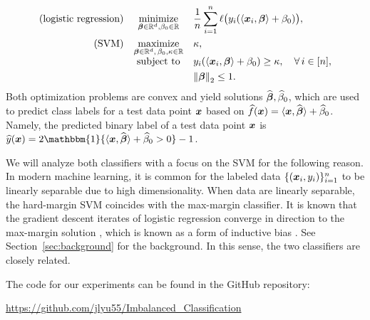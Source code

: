 \begin{subequations}
\begin{align}
\begin{array}{lcl}
    \text{(logistic regression)} 
    & 
    \mathmakebox[\widthof{$ \displaystyle\maximize \limits_{\bbeta \in \R^d, \, \beta_0, \kappa \in \R} $}][c]{
    \minimize \limits_{\vbeta \in \R^d, \beta_0 \in \R}
    } 
    & 
    \mathmakebox[\widthof{$ \displaystyle y_i ( \< \xx_i, \bbeta \> + \beta_0 ) \ge \kappa,
	\quad \forall\, i \in [n], $}][l]{
    \displaystyle \frac{1}{n} \sum_{i=1}^n \ell \bigl( y_i(\langle \vx_i, \vbeta \rangle + \beta_0) \bigr),
    }
\end{array}
\label{eq:logistic}
\\
\begin{array}{lcl}
    \text{(SVM)}  & 
    \maximize \limits_{\bbeta \in \R^d, \, \beta_0, \kappa \in \R} & \kappa,  \\
    & \text{subject to}\vphantom{\displaystyle\max_\kappa} & y_i ( \< \xx_i, \bbeta \> + \beta_0 ) \ge \kappa,
	\quad \forall\, i \in [n],    
    \\
    & & \norm{\bbeta}_2  \le  1.
\end{array}
\label{eq:SVM-0}
\end{align}
\end{subequations}
Both optimization problems are convex and yield solutions $\widehat {{\boldsymbol{\beta}}}, \widehat \beta_0$, which are used to predict class labels for a test data point ${\boldsymbol{x}}$ based on $\widehat f({\boldsymbol{x}}) = \langle {\boldsymbol{x}}, \widehat {{\boldsymbol{\beta}}} \rangle + \widehat \beta_0$. Namely, the predicted binary label of a test data point ${\boldsymbol{x}}$ is $\hat{y} (\xx) = 2\mathbbm{1}\{\langle \vx, \hat{\vbeta} \rangle + \hat{\beta}_0 > 0\} - 1$.


We will analyze both classifiers with a focus on the SVM for the following reason. In modern machine learning, it is common for the labeled data $\{({\boldsymbol{x}}_i, y_i)\}_{i = 1}^n$ to be linearly separable due to high dimensionality.
When data are linearly separable, the hard-margin SVM coincides with the max-margin classifier. It is known that the gradient descent iterates of logistic regression converge in direction to the max-margin solution \cite{Soudry_implicit_bias, ji2019riskparameterconvergencelogistic}, which is known as a form of inductive bias \cite{neyshabur2015searchrealinductivebias}. See Section~\ref{sec:background} for the background. In this sense, the two classifiers are closely related.

The code for our experiments can be found in the GitHub repository: 
\begin{center}
\url{https://github.com/jlyu55/Imbalanced_Classification}
\end{center}


